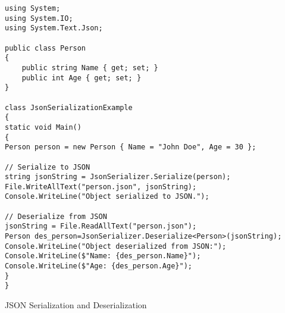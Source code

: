 \begin{listing}[H]
\begin{verbatim}
using System;
using System.IO;
using System.Text.Json;

public class Person
{
    public string Name { get; set; }
    public int Age { get; set; }
}

class JsonSerializationExample
{
static void Main()
{
Person person = new Person { Name = "John Doe", Age = 30 };

// Serialize to JSON
string jsonString = JsonSerializer.Serialize(person);
File.WriteAllText("person.json", jsonString);
Console.WriteLine("Object serialized to JSON.");

// Deserialize from JSON
jsonString = File.ReadAllText("person.json");
Person des_person=JsonSerializer.Deserialize<Person>(jsonString);
Console.WriteLine("Object deserialized from JSON:");
Console.WriteLine($"Name: {des_person.Name}");
Console.WriteLine($"Age: {des_person.Age}");
}
}
\end{verbatim}
\caption{JSON Serialization and Deserialization} 
\label{JSONSerialization}
\end{listing}